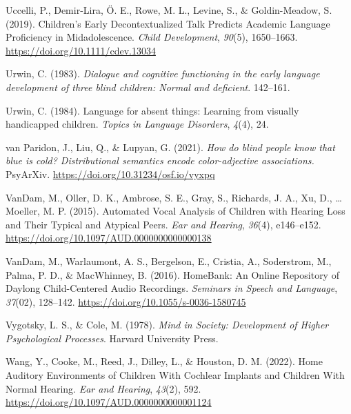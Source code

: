 \documentclass[
  man,floatsintext]{apa6}
\newlength{\cslhangindent}
\newlength{\cslentryspacingunit} %
\newenvironment{CSLReferences}[2] %
 {%
  \setlength{\parindent}{0pt}
  \ifodd #1
  \let\oldpar\par
  \def\par{\hangindent=\cslhangindent\oldpar}
  \fi
  \setlength{\parskip}{#2\cslentryspacingunit}
 }%
 {}
\begin{document}
\begin{CSLReferences}{1}{0}
\leavevmode{}%
Uccelli, P., Demir-Lira, Ö. E., Rowe, M. L., Levine, S., \& Goldin-Meadow, S. (2019). Children's {Early Decontextualized Talk Predicts Academic Language Proficiency} in {Midadolescence}. \emph{Child Development}, \emph{90}(5), 1650--1663. \url{https://doi.org/10.1111/cdev.13034}

\leavevmode{}%
Urwin, C. (1983). \emph{Dialogue and cognitive functioning in the early language development of three blind children: {Normal} and deficient}. 142--161.

\leavevmode{}%
Urwin, C. (1984). Language for absent things: Learning from visually handicapped children. \emph{Topics in Language Disorders}, \emph{4}(4), 24.

\leavevmode{}%
van Paridon, J., Liu, Q., \& Lupyan, G. (2021). \emph{How do blind people know that blue is cold? {Distributional} semantics encode color-adjective associations.} PsyArXiv. \url{https://doi.org/10.31234/osf.io/vyxpq}

\leavevmode{}%
VanDam, M., Oller, D. K., Ambrose, S. E., Gray, S., Richards, J. A., Xu, D., \ldots{} Moeller, M. P. (2015). Automated {Vocal Analysis} of {Children} with {Hearing Loss} and {Their Typical} and {Atypical Peers}. \emph{Ear and Hearing}, \emph{36}(4), e146--e152. \url{https://doi.org/10.1097/AUD.0000000000000138}

\leavevmode{}%
VanDam, M., Warlaumont, A. S., Bergelson, E., Cristia, A., Soderstrom, M., Palma, P. D., \& MacWhinney, B. (2016). {HomeBank}: {An Online Repository} of {Daylong Child-Centered Audio Recordings}. \emph{Seminars in Speech and Language}, \emph{37}(02), 128--142. \url{https://doi.org/10.1055/s-0036-1580745}

\leavevmode{}%
Vygotsky, L. S., \& Cole, M. (1978). \emph{Mind in {Society}: {Development} of {Higher Psychological Processes}}. Harvard University Press.

\leavevmode{}%
Wang, Y., Cooke, M., Reed, J., Dilley, L., \& Houston, D. M. (2022). Home {Auditory Environments} of {Children With Cochlear Implants} and {Children With Normal Hearing}. \emph{Ear and Hearing}, \emph{43}(2), 592. \url{https://doi.org/10.1097/AUD.0000000000001124}


\end{CSLReferences}
\end{document}
